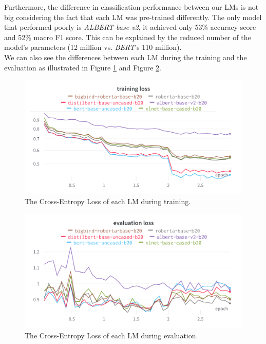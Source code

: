 \documentclass[10pt, english]{report}
\begin{document}
Furthermore, the difference in classification performance between our LMs is not big considering the fact that each LM was pre-trained differently. The only model that performed poorly is \textit{ALBERT-base-v2}, it achieved only 53\% accuracy score and 52\% macro F1 score. This can be explained by the reduced number of the model's parameters (12 million vs. \textit{BERT}'s 110 million).\\

We can also see the differences between each LM during the training and the evaluation as illustrated in Figure \ref{fig:train_loss} and Figure \ref{fig:eval_loss}.

\begin{figure}[htp]
    \centering
    \includegraphics[scale=0.2]{img/train_loss.png}
    \caption[Comparison]{The Cross-Entropy Loss of each LM during training.}
    \label{fig:train_loss}
\end{figure}

\begin{figure}[htp]
    \centering
    \includegraphics[scale=0.2]{img/eval_loss.png}
    \caption[Comparison]{The Cross-Entropy Loss of each LM during evaluation.}
    \label{fig:eval_loss}
\end{figure}
\end{document}
